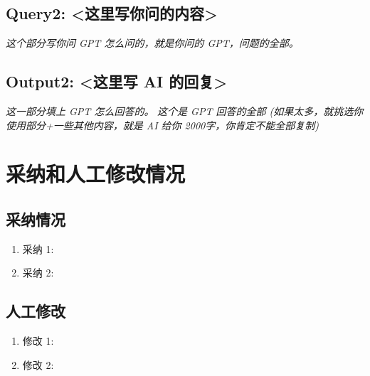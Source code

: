 \documentclass{article}
\begin{document}
\subsection*{Query2: <这里写你问的内容>}
\textit{这个部分写你问 GPT 怎么问的，就是你问的 GPT，问题的全部。}

\subsection*{Output2: <这里写 AI 的回复>}
\textit{这一部分填上 GPT 怎么回答的。}
\textit{这个是 GPT 回答的全部 (如果太多，就挑选你使用部分+一些其他内容，就是 AI 给你 2000字，你肯定不能全部复制)}


\section*{采纳和人工修改情况}
\subsection*{采纳情况}
\begin{enumerate}
    \item 采纳 1:
    \item 采纳 2:
\end{enumerate}

\subsection*{人工修改}
\begin{enumerate}
    \item 修改 1:
    \item 修改 2:
\end{enumerate}
\end{document}
